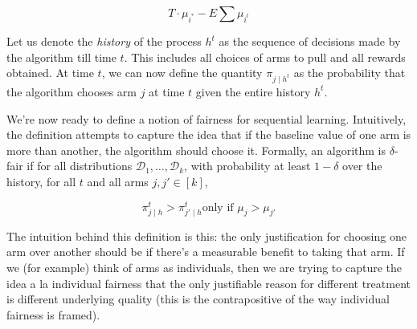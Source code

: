 \documentclass[11pt]{paper}
\begin{document}
\[ T \cdot \mu_{i^*} - E \sum \mu_{i^t} \]

Let us denote the \emph{history} of the process $h^t$ as the sequence of
decisions made by the algorithm till time $t$. This includes all choices
of arms to pull and all rewards obtained. At time $t$, we can now define
the quantity $\pi_{j \mid h^t}$ as the probability that the algorithm
chooses arm $j$ at time $t$ given the entire history $h^t$.

We're now ready to define a notion of fairness for sequential learning.
Intuitively, the definition attempts to capture the idea that if the
baseline value of one arm is more than another, the algorithm should
choose it. Formally, an algorithm is $\delta$-fair\citep{joseph_fairness_2016} if for all
distributions $\mathcal{D}_1, \ldots, \mathcal{D}_k$, with probability
at least $1-\delta$ over the history, for all $t$ and all arms
$j, j' \in [k]$,

\[ \pi^t_{j\mid h} > \pi^t_{j' \mid h} \text{only if  } \mu_j > \mu_{j'} ​\]

The intuition behind this definition is this: the only justification for
choosing one arm over another should be if there's a measurable benefit
to taking that arm. If we (for example) think of arms as individuals,
then we are trying to capture the idea a la individual fairness that the
only justifiable reason for different treatment is different underlying
quality (this is the contrapositive of the way individual fairness is
framed).






\end{document}
